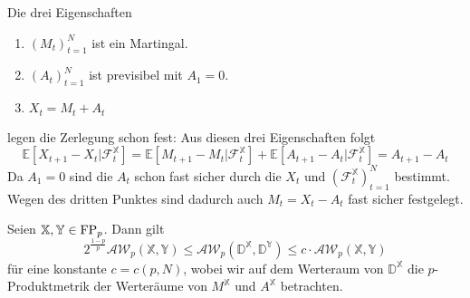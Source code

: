 Die drei Eigenschaften
\begin{enumerate}
    \item $(M_t)_{t=1}^N$ ist ein Martingal.
    \item $(A_t)_{t=1}^N$ ist previsibel mit $A_1=0$. 
    \item $X_t = M_t + A_t$
\end{enumerate}
legen die Zerlegung schon fest: Aus diesen drei Eigenschaften folgt
$$\mathbb{E}[X_{t+1} - X_t \vert \mathcal{F}_t^\mathbb{X}] = \mathbb{E}[M_{t+1} - M_t \vert \mathcal{F}_t^\mathbb{X}] + \mathbb{E}[A_{t+1} - A_t \vert \mathcal{F}_t^\mathbb{X}] = A_{t+1} - A_t$$
Da $A_1=0$ sind die $A_t$ schon fast sicher durch die $X_t$ und $(\mathcal{F}_{t}^\mathbb{X})_{t=1}^N$ bestimmt. Wegen des dritten Punktes sind dadurch auch $M_t = X_t - A_t$ fast sicher festgelegt. 
\begin{proposition}\label{thm:doob_continuous}
    Seien $\mathbb{X,Y}\in \operatorname{FP}_p$. Dann gilt
    $$2^{\frac{1-p}{p}}\mathcal{AW}_p(\mathbb{X,Y}) \leq \mathcal{AW}_p(\mathbb{D}^\mathbb{X}, \mathbb{D}^\mathbb{Y}) \leq c\cdot \mathcal{AW}_p(\mathbb{X,Y})$$
    für eine konstante $c=c(p,N)$, wobei wir auf dem Werteraum von $\mathbb{D}^\mathbb{X}$ die $p$-Produktmetrik der Werteräume von $M^\mathbb{X}$ und $A^\mathbb{X}$ betrachten.
\end{proposition}
